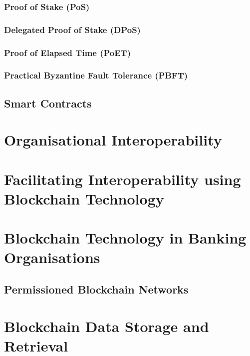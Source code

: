 \subsubsection{Proof of Stake (PoS)}

\subsubsection{Delegated Proof of Stake (DPoS)}

\subsubsection{Proof of Elapsed Time (PoET)}

\subsubsection{Practical Byzantine Fault Tolerance (PBFT)}

\subsection{Smart Contracts}

\section{Organisational Interoperability}

\section{Facilitating Interoperability using Blockchain Technology}

\section{Blockchain Technology in Banking Organisations}

\subsection{Permissioned Blockchain Networks}

\section{Blockchain Data Storage and Retrieval}